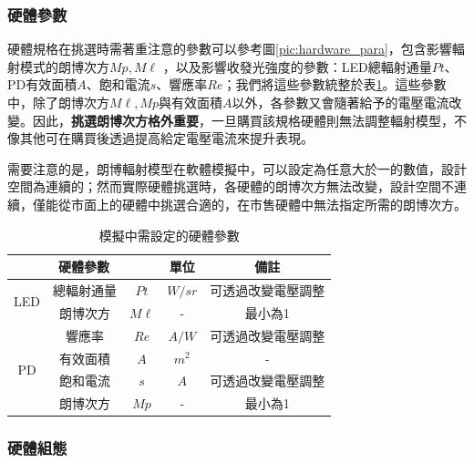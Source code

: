 \subsubsection{硬體參數}

硬體規格在挑選時需著重注意的參數可以參考圖\ref{pic:hardware_para}，包含影響輻射模式的朗博次方$Mp,M\ell$
，以及影響收發光強度的參數：LED總輻射通量$Pt$、PD有效面積$A$、飽和電流$s$、響應率$Re$；我們將這些參數統整於表\ref{tab:para_hardware}。這些參數中，除了朗博次方$M\ell,Mp$與有效面積$A$以外，各參數又會隨著給予的電壓電流改變。因此，\textbf{挑選朗博次方格外重要}，一旦購買該規格硬體則無法調整輻射模型，不像其他可在購買後透過提高給定電壓電流來提升表現。

需要注意的是，朗博輻射模型在軟體模擬中，可以設定為任意大於一的數值，設計空間為連續的；然而實際硬體挑選時，各硬體的朗博次方無法改變，設計空間不連續，僅能從市面上的硬體中挑選合適的，在市售硬體中無法指定所需的朗博次方。

\begin{table}[h]
\renewcommand{\arraystretch}{1.3}
\setlength{\arrayrulewidth}{0.15mm}
\setlength{\doublerulesep}{0.12mm}
\caption{模擬中需設定的硬體參數}
\label{tab:para_hardware}
\centering
\begin{tabular}{|c|cc|c|c|}
\hline
\multicolumn{3}{|c|}{\textbf{硬體參數}}  &\textbf{單位}  &  \textbf{備註}   \\
\hline
\multirow{2}{*}{LED} 
& 總輻射通量 &$Pt$ & $W/sr$ & 可透過改變電壓調整 \\
 & 朗博次方& $M\ell$& -  & 最小為1 \\\hline
\multirow{4}{*}{PD} 
& 響應率 &$Re$ & $A/W$ & 可透過改變電壓調整 \\
& 有效面積& $A$& $m^2$ & - \\
& 飽和電流& $s$& $A$ & 可透過改變電壓調整 \\
& 朗博次方& $Mp$& -  & 最小為1 \\\hline
\end{tabular}
\end{table}



\subsubsection{硬體組態}

